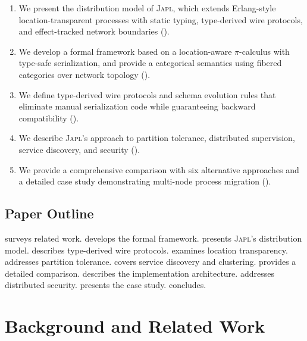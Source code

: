 \documentclass[11pt,a4paper]{article}
\newcommand{\japl}{\textsc{Japl}}
\begin{document}
\begin{enumerate}
  \item We present the distribution model of \japl{}, which extends
        Erlang-style location-transparent processes with static typing,
        type-derived wire protocols, and effect-tracked network boundaries
        ().
  \item We develop a formal framework based on a location-aware
        $\pi$-calculus with type-safe serialization, and provide a
        categorical semantics using fibered categories over network
        topology ().
  \item We define type-derived wire protocols and schema evolution rules
        that eliminate manual serialization code while guaranteeing
        backward compatibility ().
  \item We describe \japl{}'s approach to partition tolerance,
        distributed supervision, service discovery, and security
        ().
  \item We provide a comprehensive comparison with six alternative
        approaches and a detailed case study demonstrating multi-node
        process migration ().
\end{enumerate}

\subsection{Paper Outline}

 surveys related work.
 develops the formal framework.
 presents \japl{}'s distribution model.
 describes type-derived wire protocols.
 examines location transparency.
 addresses partition tolerance.
 covers service discovery and clustering.
 provides a detailed comparison.
 describes the implementation architecture.
 addresses distributed security.
 presents the case study.
 concludes.


\section{Background and Related Work}
\label{sec:background}
\end{document}
